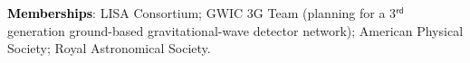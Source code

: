 \documentclass[letterpaper]{moderncv}
\begin{document}
\newpage{}
\textbf{\textcolor{black}{Memberships}}: LISA Consortium; GWIC 3G Team (planning for a 3$^\textsf{rd}$ generation ground-based gravitational-wave detector network); American Physical Society; Royal Astronomical Society.


%
%
%
%
%
%
\end{document}
